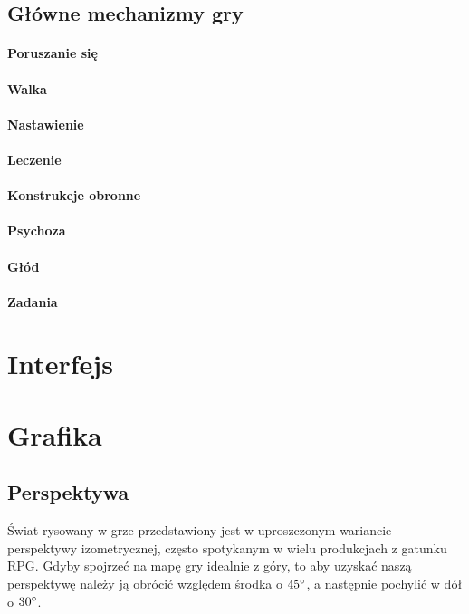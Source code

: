 \documentclass[licencjacka]{pracamgr}
\begin{document}
    \subsection{Główne mechanizmy gry}
    \paragraph{Poruszanie się}
    \paragraph{Walka}
    \paragraph{Nastawienie}
    \paragraph{Leczenie}
    \paragraph{Konstrukcje obronne}
    \paragraph{Psychoza}
    \paragraph{Głód}
    \paragraph{Zadania}



  \section{Interfejs}

  \section{Grafika}
    \subsection{Perspektywa}
    Świat rysowany w grze przedstawiony jest w uproszczonym wariancie perspektywy izometrycznej, często spotykanym w
    wielu produkcjach z gatunku RPG. Gdyby spojrzeć na mapę gry idealnie z góry, to aby uzyskać naszą perspektywę należy
    ją obrócić względem środka o $45\degree$, a następnie pochylić w dół o $30\degree$.
\end{document}
